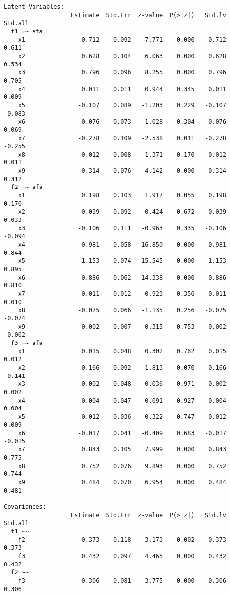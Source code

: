 \begin{verbatim}
Latent Variables:
                   Estimate  Std.Err  z-value  P(>|z|)   Std.lv  Std.all
  f1 =~ efa                                                             
    x1                0.712    0.092    7.771    0.000    0.712    0.611
    x2                0.628    0.104    6.063    0.000    0.628    0.534
    x3                0.796    0.096    8.255    0.000    0.796    0.705
    x4                0.011    0.011    0.944    0.345    0.011    0.009
    x5               -0.107    0.089   -1.203    0.229   -0.107   -0.083
    x6                0.076    0.073    1.028    0.304    0.076    0.069
    x7               -0.278    0.109   -2.538    0.011   -0.278   -0.255
    x8                0.012    0.008    1.371    0.170    0.012    0.011
    x9                0.314    0.076    4.142    0.000    0.314    0.312
  f2 =~ efa                                                             
    x1                0.198    0.103    1.917    0.055    0.198    0.170
    x2                0.039    0.092    0.424    0.672    0.039    0.033
    x3               -0.106    0.111   -0.963    0.335   -0.106   -0.094
    x4                0.981    0.058   16.850    0.000    0.981    0.844
    x5                1.153    0.074   15.545    0.000    1.153    0.895
    x6                0.886    0.062   14.338    0.000    0.886    0.810
    x7                0.011    0.012    0.923    0.356    0.011    0.010
    x8               -0.075    0.066   -1.135    0.256   -0.075   -0.074
    x9               -0.002    0.007   -0.315    0.753   -0.002   -0.002
  f3 =~ efa                                                             
    x1                0.015    0.048    0.302    0.762    0.015    0.012
    x2               -0.166    0.092   -1.813    0.070   -0.166   -0.141
    x3                0.002    0.048    0.036    0.971    0.002    0.002
    x4                0.004    0.047    0.091    0.927    0.004    0.004
    x5                0.012    0.036    0.322    0.747    0.012    0.009
    x6               -0.017    0.041   -0.409    0.683   -0.017   -0.015
    x7                0.843    0.105    7.999    0.000    0.843    0.775
    x8                0.752    0.076    9.893    0.000    0.752    0.744
    x9                0.484    0.070    6.954    0.000    0.484    0.481

Covariances:
                   Estimate  Std.Err  z-value  P(>|z|)   Std.lv  Std.all
  f1 ~~                                                                 
    f2                0.373    0.118    3.173    0.002    0.373    0.373
    f3                0.432    0.097    4.465    0.000    0.432    0.432
  f2 ~~                                                                 
    f3                0.306    0.081    3.775    0.000    0.306    0.306


\end{verbatim}
